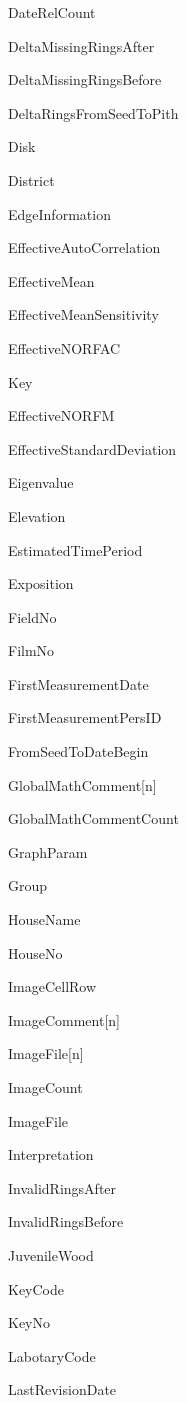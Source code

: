 \begin{multicols}{2}
\begin{itemize*}
 \item  DateRelCount
 \item  DeltaMissingRingsAfter
 \item  DeltaMissingRingsBefore
 \item  DeltaRingsFromSeedToPith
 \item  Disk
 \item  District
 \item  EdgeInformation
 \item  EffectiveAutoCorrelation
 \item  EffectiveMean
 \item  EffectiveMeanSensitivity
 \item  EffectiveNORFAC
 \item  Key
 \item  EffectiveNORFM
 \item  EffectiveStandardDeviation
 \item  Eigenvalue
 \item  Elevation
 \item  EstimatedTimePeriod
 \item  Exposition
 \item  FieldNo
 \item  FilmNo
 \item  FirstMeasurementDate
 \item  FirstMeasurementPersID
 \item  FromSeedToDateBegin
 \item  GlobalMathComment[n]
 \item  GlobalMathCommentCount
 \item  GraphParam
 \item  Group
 \item  HouseName
 \item  HouseNo
 \item  ImageCellRow
 \item  ImageComment[n]
 \item  ImageFile[n]
 \item  ImageCount
 \item  ImageFile
 \item  Interpretation
 \item  InvalidRingsAfter
 \item  InvalidRingsBefore
 \item  JuvenileWood
 \item  KeyCode
 \item  KeyNo
 \item  LabotaryCode
 \item  LastRevisionDate

\end{itemize*}
\end{multicols}
